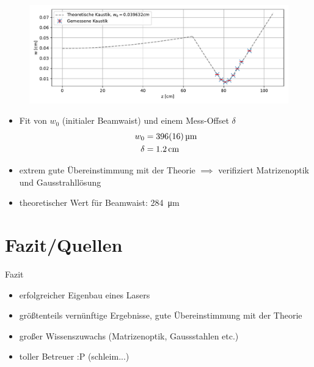 \documentclass[10pt, aspectratio=169]{beamer}
\begin{document}
\begin{frame}
  \begin{figure}[b]\centering
    \includegraphics[width=.8\columnwidth]{figs/kaustik.pdf}
  \end{figure}
  \begin{itemize}
  \item<1-> Fit von \(w_0\) (initialer Beamwaist) und einem
    Mess-Offset \(\delta\)
    \begin{align*}
      w_0 & =\SI{396\pm 16}{\micro\meter} \\
      \delta & =\SI{1.2}{cm}
    \end{align*}
  \item<2-> extrem gute \"Ubereinstimmung mit der Theorie \(\implies\)
    verifiziert Matrizenoptik und Gausstrahll\"osung
  \item<3-> theoretischer Wert f\"ur Beamwaist: \SI{284}{\micro\meter}
  \end{itemize}
\end{frame}


\section{Fazit/Quellen}

\begin{frame}{Fazit}
  \begin{itemize}
  \item<1-> erfolgreicher Eigenbau eines Lasers
  \item<2-> gr\"o\ss{}tenteils vern\"unftige Ergebnisse, gute
    \"Ubereinstimmung mit der Theorie
  \item<3-> gro\ss{}er Wissenszuwachs (Matrizenoptik, Gaussstahlen
    etc.)
  \item<4-> toller Betreuer :P (schleim...)
  \end{itemize}
\end{frame}
\end{document}
